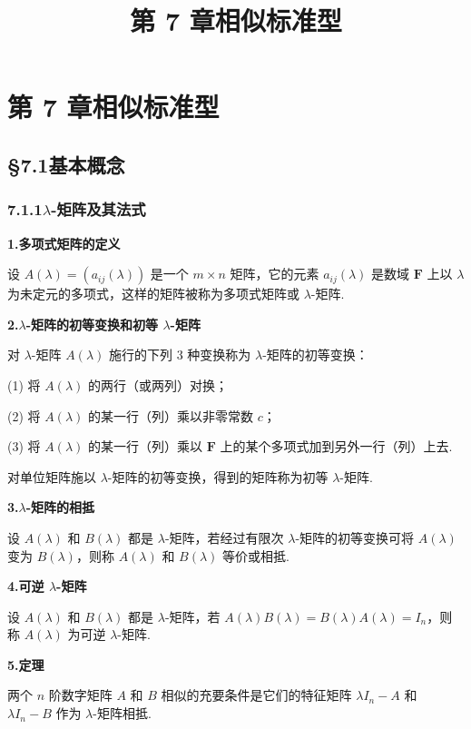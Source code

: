 \documentclass[UTF8, 12pt, fontset=fandol, oneside]{ctexart}
\title{第 7 章\quad 相似标准型}
\author{}
\date{}
\begin{document}
\maketitle

\section*{第 7 章\quad 相似标准型}

\subsection*{§7.1\quad 基本概念}

\subsubsection*{7.1.1\quad $\lambda$-矩阵及其法式}

\noindent\textbf{1.\quad 多项式矩阵的定义}

设 $A(\lambda)=(a_{ij}(\lambda))$ 是一个 $m\times n$ 矩阵，它的元素 $a_{ij}(\lambda)$ 是数域 $\mathbf{F}$ 上以 $\lambda$ 为未定元的多项式，这样的矩阵被称为多项式矩阵或 $\lambda$-矩阵.

\noindent\textbf{2.\quad $\lambda$-矩阵的初等变换和初等 $\lambda$-矩阵}

对 $\lambda$-矩阵 $A(\lambda)$ 施行的下列 3 种变换称为 $\lambda$-矩阵的初等变换：

(1) 将 $A(\lambda)$ 的两行（或两列）对换；

(2) 将 $A(\lambda)$ 的某一行（列）乘以非零常数 $c$；

(3) 将 $A(\lambda)$ 的某一行（列）乘以 $\mathbf{F}$ 上的某个多项式加到另外一行（列）上去.

对单位矩阵施以 $\lambda$-矩阵的初等变换，得到的矩阵称为初等 $\lambda$-矩阵.

\noindent\textbf{3.\quad $\lambda$-矩阵的相抵}

设 $A(\lambda)$ 和 $B(\lambda)$ 都是 $\lambda$-矩阵，若经过有限次 $\lambda$-矩阵的初等变换可将 $A(\lambda)$ 变为 $B(\lambda)$，则称 $A(\lambda)$ 和 $B(\lambda)$ 等价或相抵.

\noindent\textbf{4.\quad 可逆 $\lambda$-矩阵}

设 $A(\lambda)$ 和 $B(\lambda)$ 都是 $\lambda$-矩阵，若 $A(\lambda)B(\lambda)=B(\lambda)A(\lambda)=I_n$，则称 $A(\lambda)$ 为可逆 $\lambda$-矩阵.

\noindent\textbf{5.\quad 定理}

两个 $n$ 阶数字矩阵 $A$ 和 $B$ 相似的充要条件是它们的特征矩阵 $\lambda I_n-A$ 和 $\lambda I_n-B$ 作为 $\lambda$-矩阵相抵.
\end{document}
